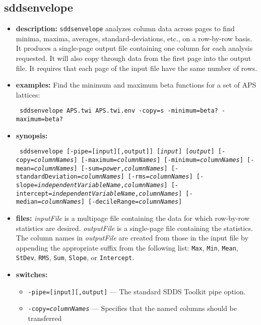 \newpage
\subsection{sddsenvelope}
\label{sddsenvelope}

\begin{itemize}
\item {\bf description:}
{\tt sddsenvelope} analyzes column data across pages to find minima,
maxima, averages, standard-deviations, etc., on a row-by-row basis.
It produces a single-page output file containing one column for each analysis
requested.  It will also copy through data from the first page into the output file.
It requires that each page of the input file have the same number of rows.
\item {\bf examples:}
Find the minimum and maximum beta functions for a set of APS lattices:
\begin{flushleft}{\tt
sddsenvelope APS.twi APS.twi.env -copy=s -minimum=beta? -maximum=beta?
}\end{flushleft}
\item {\bf synopsis:}
\begin{flushleft}{\tt
sddsenvelope [-pipe=[input][,output]] [{\em input}] [{\em output}] [-copy={\em columnNames}] 
[-maximum={\em columnNames}] [-minimum={\em columnNames}] 
[-mean={\em columnNames}] [-sum={\em power},{\em columnNames}] 
[-standardDeviation={\em columnNames}] [-rms={\em columnNames}] 
[-slope={\em independentVariableName},{\em columnNames}]
[-intercept={\em independentVariableName},{\em columnNames}] 
[-median={\em columnNames}] [-decileRange={\em columnNames}]
}\end{flushleft}
\item {\bf files:}
      {\em inputFile} is a multipage file containing the data for which row-by-row 
      statistics are desired.  {\em outputFile} is a single-page file containing the    
      statistics.  The column names in {\em outputFile} are created from those in the
      input file by appending the appropriate suffix from the following list:
      {\tt Max}, {\tt Min}, {\tt Mean}, {\tt StDev}, {\tt RMS}, {\tt Sum}, {\tt Slope}, or
      {\tt Intercept}.
\item {\bf switches:}
    \begin{itemize}
    \item {\tt -pipe=[input][,output]} --- The standard SDDS Toolkit pipe option.
    \item {\tt -copy={\em columnNames}} --- Specifies that the named columns should be transferred

\end{itemize}
\end{itemize}
